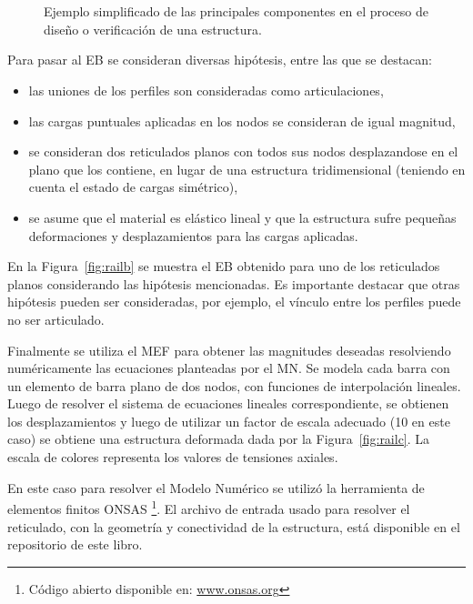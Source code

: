 \begin{figure}[htb]
  \centering
	\\
	\\
  \caption{Ejemplo simplificado de las principales componentes en el proceso de diseño o verificación de una estructura.}
\end{figure} 


Para pasar al EB se consideran diversas hipótesis, entre las que se destacan:
\begin{itemize}
  \item las uniones de los perfiles son consideradas como articulaciones,
  \item las cargas puntuales aplicadas en los nodos se consideran de igual magnitud,
  \item se consideran dos reticulados planos con todos sus nodos desplazandose en el plano que los contiene, en lugar de una estructura tridimensional (teniendo en cuenta el estado de cargas simétrico), 
  \item se asume que el material es elástico lineal y que la estructura sufre pequeñas deformaciones y desplazamientos para las cargas aplicadas.
\end{itemize}
%
%
En la Figura~\ref{fig:railb} se muestra el EB obtenido para uno de los reticulados planos considerando las hipótesis mencionadas. %
%
Es importante destacar que otras hipótesis pueden ser consideradas, por ejemplo, el vínculo entre los perfiles puede no ser articulado. %


Finalmente se utiliza el MEF para obtener las magnitudes deseadas resolviendo numéricamente las ecuaciones planteadas por el MN. %
%
Se modela cada barra con un elemento de barra plano de dos nodos, con funciones de interpolación lineales. %
%
Luego de resolver el sistema de ecuaciones lineales correspondiente, se obtienen los desplazamientos y luego de utilizar un factor de escala adecuado (10 en este caso) se obtiene una estructura deformada dada por la Figura~\ref{fig:railc}. La escala de colores representa los valores de tensiones axiales. %
%

En este caso para resolver el Modelo Numérico se utilizó la herramienta de elementos finitos ONSAS \footnote{Código abierto disponible en: \href{http://www.onsas.org}{www.onsas.org}}. %
%
El archivo de entrada usado para resolver el reticulado, con la geometría y conectividad de la estructura, está disponible en el repositorio de este libro.


